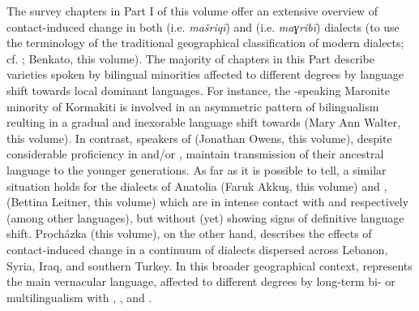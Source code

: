\documentclass[output=paper]{langsci/langscibook}
\begin{document}
The survey chapters in Part I of this volume offer an extensive overview of contact-induced change in both  (i.e. \textit{mašriqī}) and  (i.e. \textit{maɣribī})  dialects (to use the terminology of the traditional geographical classification of modern  dialects; cf. \citealt{Palva2009}; Benkato, this volume). The majority of chapters in this Part describe varieties spoken by bilingual minorities affected to different degrees by {language shift} towards local dominant languages. For instance, the -speaking Maronite minority of {Kormakiti} is involved in an asymmetric pattern of {bilingualism} reulting in a gradual and inexorable {language shift} towards  (Mary Ann Walter, this volume). In contrast, speakers of   (Jonathan Owens, this volume), despite considerable proficiency in  and/or , maintain {transmission} of their ancestral language to the younger generations. As far as it is possible to tell, a similar situation holds for the  dialects of {Anatolia} (Faruk Akkuş, this volume) and , (Bettina Leitner, this volume) which are in intense contact with  and  respectively (among other languages), but without (yet) showing signs of definitive {language shift}. Procházka (this volume), on the other hand, describes the effects of contact-induced change in a continuum of   dialects dispersed across Lebanon, Syria, Iraq, and southern Turkey. In this broader geographical context,  represents the main vernacular language, affected to different degrees by long-term bi- or multilingualism with , , and .
\end{document}
